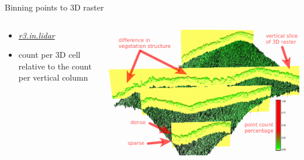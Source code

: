 \documentclass[xcolor={dvipsnames,usenames},beamer,aspectratio=169]{beamer}
\newcommand{\gmodule}[1]{\href{http://grass.osgeo.org/grass71/manuals/#1.html}{\emph{#1}}}
\begin{document}
\begin{frame}{Binning points to 3D raster}

\begin{columns}
\begin{column}{0.28\textwidth}

\begin{itemize}
  \item \gmodule{r3.in.lidar}
  \item count per 3D cell relative to the count per vertical column
\end{itemize}

\end{column}
\begin{column}{0.7\textwidth}

\begin{center}
  \includegraphics[width=\textwidth]{grass/red_green_3d_labels}
\end{center}

\end{column}
\end{columns}

\end{frame}
\end{document}
